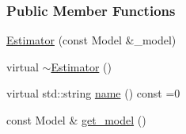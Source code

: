\subsubsection*{Public Member Functions}
\begin{DoxyCompactItemize}
\item 
\hyperlink{classmappel_1_1estimator_1_1Estimator_a0cc662eff2435041243e991f84febf01}{Estimator} (const Model \&\+\_\+model)
\item 
virtual \hyperlink{classmappel_1_1estimator_1_1Estimator_a242cd96956c12988d4be9f8b3e18c142}{$\sim$\+Estimator} ()
\item 
virtual std\+::string \hyperlink{classmappel_1_1estimator_1_1Estimator_a9f156286a85938814b9eb0261c7e46ce}{name} () const =0
\item 
const Model \& \hyperlink{classmappel_1_1estimator_1_1Estimator_a076f485dfe0a925e01520c173f6fffe4}{get\+\_\+model} ()
\end{DoxyCompactItemize}
{\bf }\par
